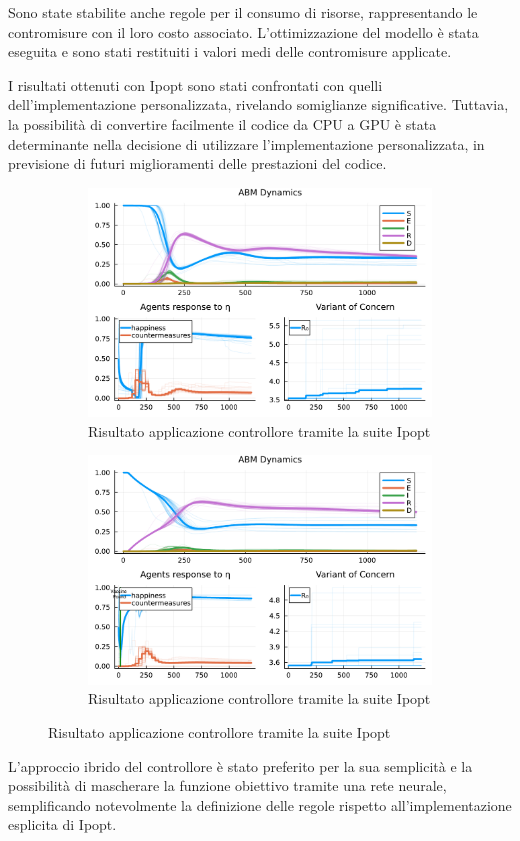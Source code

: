 Sono state stabilite anche regole per il consumo di risorse, 
rappresentando le contromisure con il loro costo associato. 
L'ottimizzazione del modello è stata eseguita e sono stati restituiti 
i valori medi delle contromisure applicate.

I risultati ottenuti con Ipopt sono stati confrontati con quelli 
dell'implementazione personalizzata, rivelando somiglianze 
significative. Tuttavia, la possibilità di convertire facilmente 
il codice da CPU a GPU è stata determinante nella decisione di 
utilizzare l'implementazione personalizzata, in previsione di futuri 
miglioramenti delle prestazioni del codice.

\begin{figure}[!hb]
	\centering
	\begin{subfigure}[b]{\textwidth}
		\centering
		\includegraphics[width=\textwidth]{img/SocialNetworkABM_IPOPT_CONTROL.pdf}
		\caption{Risultato applicazione controllore tramite la suite Ipopt}
		\label{fig:ipopt_res1}
	\end{subfigure}
	\hfill
	\begin{subfigure}[b]{\textwidth}
		\centering
		\includegraphics[width=\textwidth]{img/SocialNetworkABM_IPOPT_ALL.pdf}
		\caption{Risultato applicazione controllore tramite la suite Ipopt}
		\label{fig:ipopt_res2}
	\end{subfigure}
\end{figure}

L'approccio ibrido del controllore è stato preferito per la sua 
semplicità e la possibilità di mascherare la funzione obiettivo 
tramite una rete neurale, semplificando notevolmente la definizione 
delle regole rispetto all'implementazione esplicita di Ipopt.